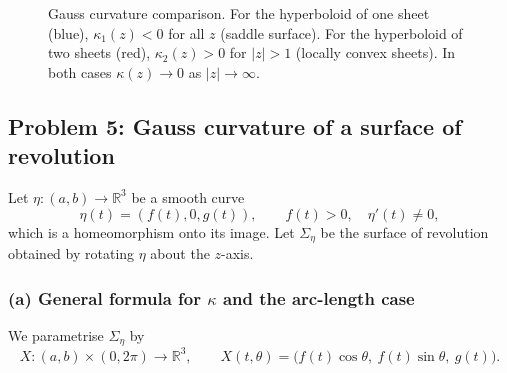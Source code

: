 \documentclass[12pt,a4paper]{article}
\theoremstyle{plain}
\theoremstyle{definition}      %
\begin{document}
\begin{figure}[h]
	\centering
	\caption{Gauss curvature comparison. For the hyperboloid of one sheet
		(blue), $\kappa_1(z)<0$ for all $z$ (saddle surface). For the hyperboloid
		of two sheets (red), $\kappa_2(z)>0$ for $|z|>1$ (locally convex sheets).
		In both cases $\kappa(z)\to 0$ as $|z|\to\infty$.}
	\label{fig:hyperboloid-curvature-comparison}
\end{figure}

\clearpage

\subsection*{Problem 5: Gauss curvature of a surface of revolution}

Let $\eta:(a,b)\to\mathbb{R}^3$ be a smooth curve
\[
\eta(t) = (f(t),0,g(t)), \qquad f(t)>0,\quad \eta'(t)\neq 0,
\]
which is a homeomorphism onto its image. Let $\Sigma_\eta$ be the surface
of revolution obtained by rotating $\eta$ about the $z$-axis.

\subsubsection*{(a) General formula for $\kappa$ and the arc-length case}

We parametrise $\Sigma_\eta$ by
\[
X:(a,b)\times (0,2\pi)\longrightarrow\mathbb{R}^3,\qquad
X(t,\theta) = \bigl(f(t)\cos\theta,\ f(t)\sin\theta,\ g(t)\bigr).
\]
\end{document}

